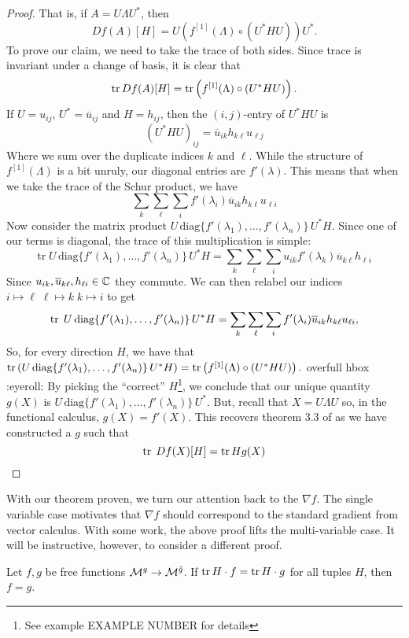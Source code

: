 \begin{proof}
That is, if $A = U   \Lambda U ^{*} $, then
\[
  Df(A)[H] = U \left( f ^{[1]} (\Lambda) \circ (U ^{* } H U) \right)U ^{*}.
\]
%
To prove our claim, we need to take the trace of both sides. Since trace is
invariant under a change of basis, it is clear that
\[
  \operatorname{tr} Df(A)[H] = \operatorname{tr} \left( f ^{[1]} (\Lambda) \circ (U ^{* } H U) \right).
\]
If $U = u_{ij}$, $U ^{*} = \overline{u}_{ij}$ and $H = h_{ij}$, then the
$(i,j)$-entry of $U ^{*}HU$ is
\[
  {(U ^{* } H U)}_{ij} = \overline{u}_{ik}h_{k\ell}u_{\ell j}
\]
Where we sum over the duplicate indices $k$ and $\ell$. While the structure of
$f ^{[1]} (\Lambda)$ is a bit unruly, our diagonal entries are $f'(\lambda)$.
This means that when we take the trace of the Schur product, we have
\[
 \sum_k\sum_\ell \sum_i f'(\lambda_i)\overline{u}_{ik}h_{k\ell}u_{\ell i}
\]
Now consider the matrix product
$U\, \text{diag} \{f'(\lambda_1), \dots ,f'(\lambda_n)\} \,U ^{*} H $. Since one of our terms
is diagonal, the trace of this multiplication is simple:
\[
  \text{tr}\; U \,\text{diag} \{f'(\lambda_1), \dots ,f'(\lambda_n)\}\, U ^{*} H
  = \sum_k\sum_\ell\sum_i  u_{ik}f'(\lambda_k) \overline{u}_{k \ell} h_{\ell i}
\]
Since \(u_{ik}, \overline{u}_{k\ell}, h_{\ell i} \in \mathbb{C} \) they commute. We can
then relabel our indices
$i \mapsto \ell\; \ell \mapsto k \; k \mapsto i $ to get
\[
  \operatorname{tr}\; U \,\text{diag} \{f'(\lambda_1), \dots ,f'(\lambda_n)\}\, U ^{*} H
  = \sum_k\sum_\ell \sum_i f'(\lambda_i) \overline{u}_{i k} h_{k \ell}u_{\ell i},
\]
So, for every direction \(H\), we have that
$\operatorname{tr} \left( U\, \text{diag} \{f'(\lambda_1), \dots ,f'(\lambda_n)\} \,U ^{*} H\right) =
   \operatorname{tr} \left( f ^{[1]} (\Lambda) \circ (U ^{* } H U) \right). $
{\color{red} overfull hbox :eyeroll:}
By picking the ``correct'' \(H\)\footnote{See example EXAMPLE NUMBER for
  details}, we conclude that our unique quantity \(g(X)\) is
\(U\, \text{diag} \{f'(\lambda_1), \dots ,f'(\lambda_n)\} \,U ^{*} \). But,
recall that \(X=U\Lambda U\) so, in the functional calculus, $g(X) = f'(X)$.
This recovers theorem 3.3 of \cite{pascoeTrace2020} as we have constructed a
\(g\) such that
\[
  \operatorname{tr} \; Df(X)[H] = \operatorname{tr} H g(X)
\]
\end{proof}

With our theorem proven, we turn our attention back to the \(\nabla f\). The
single variable case motivates that \(\nabla f\) should correspond to the
standard gradient from vector calculus. With some work, the above proof lifts
the multi-variable case. It will be instructive, however, to consider a
different proof.

\begin{theorem}
Let \(f,g\) be free functions \(\mathcal{M}^{g} \to \mathcal{M}^{\tilde{g}} \). If
\(\operatorname{tr} H \cdot f = \operatorname{tr} H \cdot g\) for all tuples \(H\), then \(f=g\).
\end{theorem}

